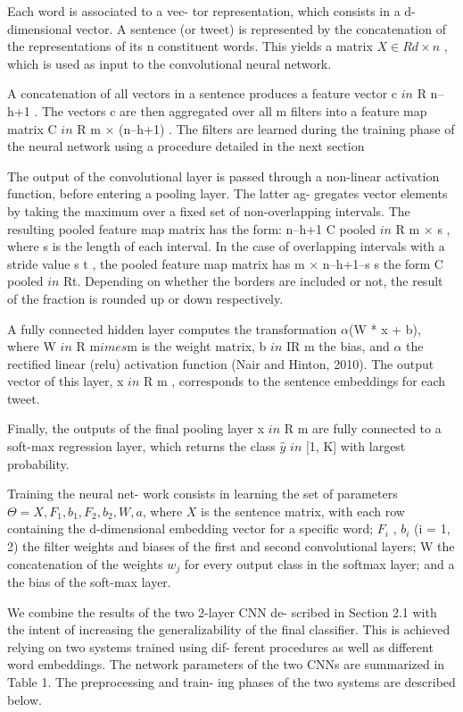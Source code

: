 Each word is associated to a vec- tor representation, which consists
in a d-dimensional vector. A sentence (or tweet) is represented by the
concatenation of the representations of its n constituent words. This
yields a matrix $X \in R d\times n$ , which is used as input to the
convolutional neural network.

A concatenation of all vectors in a sentence produces
a feature vector c $in$ R n--h+1 . The vectors c are
then aggregated over all m filters into a feature map
matrix C $in$ R m $\times$ (n--h+1) . The filters are learned
during the training phase of the neural network using
a procedure detailed in the next section

The output of the convolutional layer is passed through a non-linear
activation function, before entering a pooling layer. The latter ag-
gregates vector elements by taking the maximum over a fixed set of
non-overlapping intervals. The resulting pooled feature map matrix has
the form: n--h+1 C pooled $in$ R m $\times$ s , where s is the length
of each interval. In the case of overlapping intervals with a stride
value s t , the pooled feature map matrix has m $\times$ n--h+1--s s
the form C pooled $in$ Rt. Depending on whether the borders are
included or not, the result of the fraction is rounded up or down
respectively.

A fully connected hidden layer computes the transformation $\alpha$(W
* x + b), where W $in$ R m$ imes$m is the weight matrix, b $in$ IR m
the bias, and $\alpha$ the rectified linear (relu) activation function
(Nair and Hinton, 2010). The output vector of this layer, x $in$ R m ,
corresponds to the sentence embeddings for each tweet.

Finally, the outputs of the final pooling layer x $in$ R m are fully
connected to a soft-max regression layer, which returns the class
$\hat{y}$ $in$ [1, K] with largest probability.

Training the neural net- work consists in learning the set of
parameters $\Theta = {X, F_1 , b_1 , F_2 , b_2 , W, a}$, where $X$ is
the sentence matrix, with each row containing the d-dimensional
embedding vector for a specific word; $F_i$ , $b_i$ (i = {1, 2}) the
filter weights and biases of the first and second convolutional
layers; W the concatenation of the weights $w_j$ for every output
class in the softmax layer; and a the bias of the soft-max layer.

We combine the results of the two 2-layer CNN de- scribed in Section
2.1 with the intent of increasing the generalizability of the final
classifier.  This is achieved relying on two systems trained using
dif- ferent procedures as well as different word embeddings. The
network parameters of the two CNNs are summarized in Table 1. The
preprocessing and train- ing phases of the two systems are described
below.

